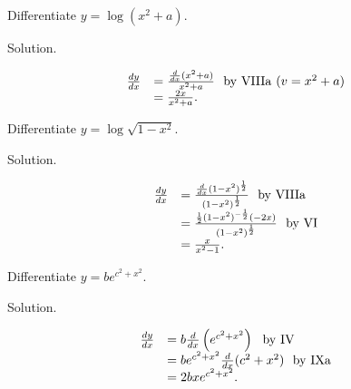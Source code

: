 \begin{example}
{\rm
Differentiate $y = \log(x^2 + a)$.

Solution. 	

\[
\begin{array}{ll}
\frac{dy}{dx} 	&= \frac{\frac{d}{dx}(x^2 + a)}{x^2 + a} \ \ {\rm by\ VIIIa}\ (v = x^2 + a)\\
  	&= \frac{2x}{x^2 + a} .
\end{array}
\]
}
\end{example}

\begin{example}
\label{ex:2-46}
{\rm
Differentiate $y = \log \sqrt{1 - x^2}$.


Solution. 

\[
\begin{array}{ll}
	\frac{dy}{dx} 
&	= \frac{\frac{d}{dx}(1 - x^2)^{\frac{1}{2}}}{(1 - x^2)^{\frac{1}{2}}} \ \ {\rm by\ VIIIa}\\
&  	= \frac{\frac{1}{2} (1 - x^2)^{-\frac{1}{2}}(-2x)}{(1 - x^2)^{\frac{1}{2}}} \ \ {\rm by\ VI}\\
&  	= \frac{x}{x^2 - 1}.
\end{array}
\]
}
\end{example}


\begin{example}
{\rm
Differentiate $y = be^{c^2 + x^2}$.

Solution. 

\[
\begin{array}{ll}
	\frac{dy}{dx} 
&=	b\frac{d}{dx} \left ( e^{c^2 + x^2} \right ) \ \ {\rm by\ IV}\\
&  	= be^{c^2 + x^2} \frac{d}{dx} (c^2 + x^2)  \ \ {\rm by\ IXa}\\
&  	= 2bxe^{c^2 + x^2}.
\end{array}
\]
}
\end{example}

